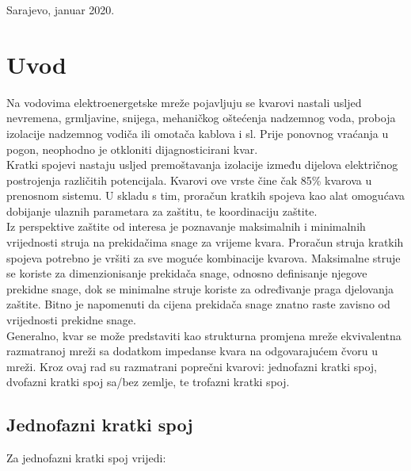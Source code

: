 \documentclass[a4paper, 12pt]{article}
\numberwithin{figure}{section}
\numberwithin{equation}{section}
\begin{document}

\vfill
\begin{center}
	Sarajevo, januar 2020.
\end{center}

\newpage
\clearpage\thispagestyle{empty}

\tableofcontents
{}
\setcounter{page}{2}

\newpage
\section{Uvod}

Na vodovima elektroenergetske mreže pojavljuju se kvarovi nastali usljed nevremena, grmljavine, snijega, mehaničkog oštećenja nadzemnog voda, proboja izolacije nadzemnog vodiča ili omotača kablova i sl. Prije ponovnog vraćanja u pogon, neophodno je otkloniti dijagnosticirani kvar. \\

Kratki spojevi nastaju usljed premoštavanja izolacije između dijelova električnog postrojenja različitih potencijala. Kvarovi ove vrste čine čak 85\% kvarova u prenosnom sistemu. U skladu s tim, proračun kratkih spojeva kao alat omogućava dobijanje ulaznih parametara za zaštitu, te koordinaciju zaštite. \\

Iz perspektive zaštite od interesa je poznavanje maksimalnih i minimalnih vrijednosti struja na prekidačima snage za vrijeme kvara. Proračun struja kratkih spojeva potrebno je vršiti za sve moguće kombinacije kvarova. Maksimalne struje se koriste za dimenzionisanje prekidača snage, odnosno definisanje njegove prekidne snage, dok se minimalne struje koriste za određivanje praga djelovanja zaštite. Bitno je napomenuti da cijena prekidača snage znatno raste zavisno od vrijednosti prekidne snage. \cite{b0}\\

Generalno, kvar se može predstaviti kao strukturna promjena mreže ekvivalentna razmatranoj mreži sa dodatkom impedanse kvara na odgovarajućem čvoru u mreži. Kroz ovaj rad su razmatrani poprečni kvarovi: jednofazni kratki spoj, dvofazni kratki spoj sa/bez zemlje, te trofazni kratki spoj. 

\subsection{Jednofazni kratki spoj}

Za jednofazni kratki spoj \cite{b1} vrijedi:
\end{document}
